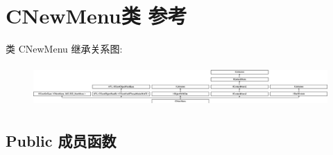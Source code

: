\hypertarget{class_c_new_menu}{}\section{C\+New\+Menu类 参考}
\label{class_c_new_menu}
类 C\+New\+Menu 继承关系图\+:\begin{figure}[H]
\begin{center}
\leavevmode
\includegraphics[height=1.590909cm]{class_c_new_menu}
\end{center}
\end{figure}
\subsection*{Public 成员函数}
